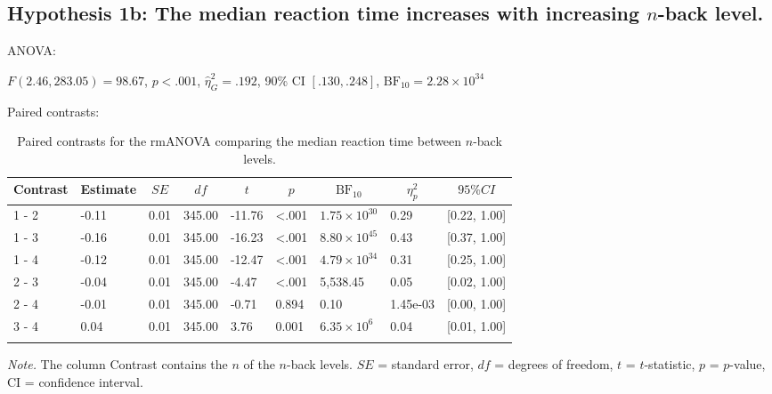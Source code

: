 \documentclass[
  man,floatsintext]{apa6}
\begin{document}
\newpage

\hypertarget{hypothesis-1b-the-median-reaction-time-increases-with-increasing-n-back-level.}{%
\subsection{\texorpdfstring{Hypothesis 1b: The median reaction time increases with increasing \(n\)-back level.}{Hypothesis 1b: The median reaction time increases with increasing n-back level.}}\label{hypothesis-1b-the-median-reaction-time-increases-with-increasing-n-back-level.}}

ANOVA:

\(F(2.46, 283.05) = 98.67\), \(p < .001\), \(\hat{\eta}^2_G = .192\), 90\% CI \([.130, .248]\), \(\mathrm{BF}_{\textrm{10}} = 2.28 \times 10^{34}\)

Paired contrasts:

\begin{table}[H]

\begin{center}
\begin{threeparttable}

\caption{\label{tab:unnamed-chunk-2}Paired contrasts for the rmANOVA comparing the median reaction time between $n$-back levels.}

\begin{tabular}{lllllllll}
\toprule
Contrast & \multicolumn{1}{c}{Estimate} & \multicolumn{1}{c}{$SE$} & \multicolumn{1}{c}{$df$} & \multicolumn{1}{c}{$t$} & \multicolumn{1}{c}{$p$} & \multicolumn{1}{c}{$\mathrm{BF}_{\textrm{10}}$} & \multicolumn{1}{c}{$\eta_{p}^{2}$} & \multicolumn{1}{c}{$95\% CI$}\\
\midrule
1 - 2 & -0.11 & 0.01 & 345.00 & -11.76 & <.001 & $1.75 \times 10^{30}$ & 0.29 & {}[0.22, 1.00]\\
1 - 3 & -0.16 & 0.01 & 345.00 & -16.23 & <.001 & $8.80 \times 10^{45}$ & 0.43 & {}[0.37, 1.00]\\
1 - 4 & -0.12 & 0.01 & 345.00 & -12.47 & <.001 & $4.79 \times 10^{34}$ & 0.31 & {}[0.25, 1.00]\\
2 - 3 & -0.04 & 0.01 & 345.00 & -4.47 & <.001 & 5,538.45 & 0.05 & {}[0.02, 1.00]\\
2 - 4 & -0.01 & 0.01 & 345.00 & -0.71 & 0.894 & 0.10 & 1.45e-03 & {}[0.00, 1.00]\\
3 - 4 & 0.04 & 0.01 & 345.00 & 3.76 & 0.001 & $6.35 \times 10^{6}$ & 0.04 & {}[0.01, 1.00]\\
\bottomrule
\addlinespace
\end{tabular}

\begin{tablenotes}[para]
\normalsize{\textit{Note.} The column Contrast contains the $n$ of the $n$-back levels. $SE$ = standard error, $df$ = degrees of freedom, $t$ = $t$-statistic, $p$ = $p$-value, CI = confidence interval.}
\end{tablenotes}

\end{threeparttable}
\end{center}

\end{table}
\end{document}
